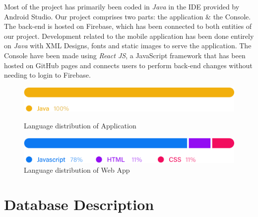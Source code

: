 \documentclass[12pt]{article}
\begin{document}
{\justify
Most of the project has primarily been coded in \textit{Java} in the IDE provided by Android Studio. Our project comprises two parts: the application \& the Console. The back-end is hosted on Firebase, which has been connected to both entities of our project. Development related to the mobile application has been done entirely on \textit{Java} with XML Designs, fonts and static images to serve the application. The Console have been made using \textit{React JS}, a JavaScript framework that has been hosted on GitHub pages and connects users to perform back-end changes without needing to login to Firebase.
}
\vskip1cm
\begin{figure}[H]
    \begin{minipage}{0.47\textwidth}
      \centering
      \includegraphics[width=\linewidth]{slice1.png}
      \caption{Language distribution of Application}\label{Fig:Data1}
    \end{minipage}\hfill
    \begin{minipage}{0.47\textwidth}
      \centering
      \includegraphics[width=\linewidth]{slice2.png}\hspace{0.5cm}
      \caption{Language distribution of Web App}\label{Fig:Data2}
    \end{minipage}
\end{figure}

\section*{\LARGE{Database Description}}
\end{document}
